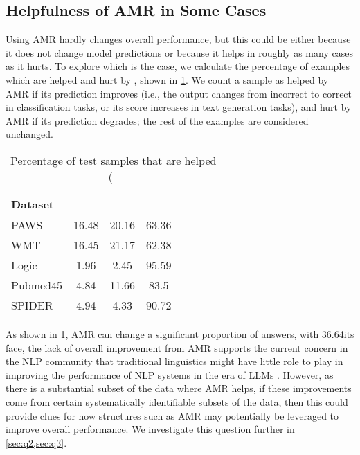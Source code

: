 \subsection{Helpfulness of AMR in Some Cases}\label{sec:help_harm_rate}

Using AMR hardly changes overall performance, but this could be either because it does not change model predictions or because it helps in roughly as many cases as it hurts. To explore which is the case, we calculate the percentage of examples which are helped and hurt by \ourmodel, shown in \cref{tab:help_hurt_rate}. We count a sample as helped by AMR if its prediction improves (i.e., the output changes from incorrect to correct in classification tasks, or its score increases in text generation tasks), and hurt by AMR if its prediction degrades; the rest of the examples are considered unchanged.
\begin{table}[t]
    \centering
    \small
    \setlength\tabcolsep{6pt}
    \begin{tabular}{lccccccc}
    \toprule
    Dataset
    & \    \\ \midrule
    PAWS &
    16.48 & 20.16 & 63.36 \\
    WMT &
     16.45 &21.17 & 62.38 \\
    Logic &
     1.96 & 2.45 & 95.59 \\
    Pubmed45 &
    4.84 & 11.66 & 83.5 \\
    SPIDER &
    4.94 & 4.33 & 90.72 \\
    \bottomrule
    \end{tabular}
    \caption{Percentage of test samples that are helped (\    }
    \vspace{-1em}
    \label{tab:help_hurt_rate}
\end{table}

As shown in \cref{tab:help_hurt_rate}, AMR can change a significant proportion of answers, with 36.64\On its face, the lack of overall improvement from AMR supports the
current concern in the NLP community that traditional linguistics might have little role to play in improving the performance of NLP systems in the era of LLMs \cite{ignat-etal-2024-has}.
However, as there is a substantial subset of the data where AMR helps, if these improvements come from certain systematically identifiable subsets of the data, then this could provide clues for how structures such as AMR may potentially be leveraged to improve overall performance.
We investigate this question further 
in \cref{sec:q2,sec:q3}. 





